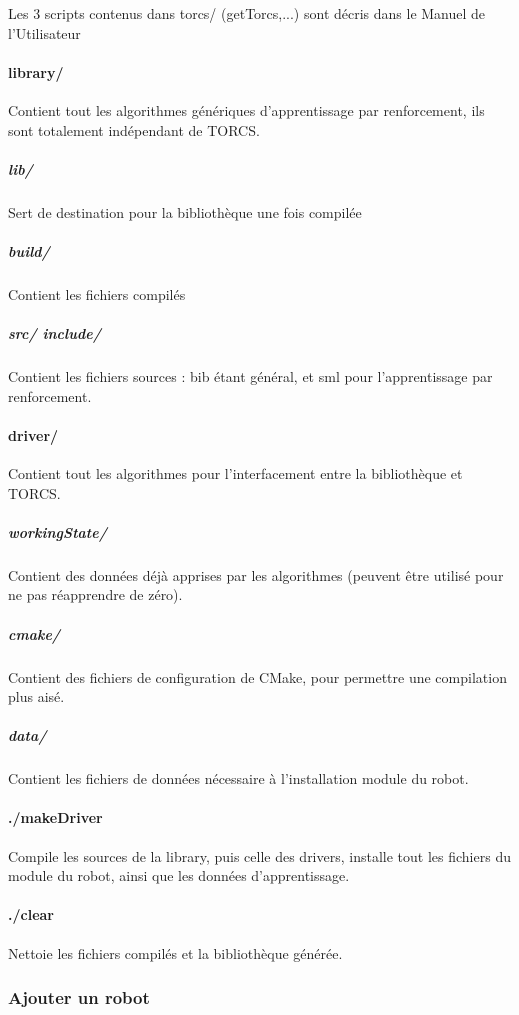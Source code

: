 \documentclass[a4paper,12pt]{article}
\begin{document}
  Les 3 scripts contenus dans torcs/ (getTorcs,...) sont décris dans le Manuel de l'Utilisateur \cite{MdU}

  \paragraph{library/} Contient tout les algorithmes génériques d'apprentissage par renforcement, ils sont
  totalement indépendant de TORCS.
    
    \subparagraph{lib/} Sert de destination pour la bibliothèque une fois compilée
    \subparagraph{build/} Contient les fichiers compilés
    \subparagraph{src/ include/} Contient les fichiers sources : bib étant général, et sml pour l'apprentissage par renforcement.
  
  \paragraph{driver/} Contient tout les algorithmes pour l'interfacement entre la bibliothèque et TORCS.
    \subparagraph{workingState/} Contient des données déjà apprises par les algorithmes (peuvent être
    utilisé pour ne pas réapprendre de zéro).
    \subparagraph{cmake/} Contient des fichiers de configuration de CMake, pour permettre une compilation
    plus aisé.
    \subparagraph{data/} Contient les fichiers de données nécessaire à l'installation module du robot.
  
  
  \paragraph{./makeDriver } Compile les sources de la library, puis celle des drivers, installe tout les fichiers
  du module du robot, ainsi que les données d'apprentissage.
  
  \paragraph{./clear } Nettoie les fichiers compilés et la bibliothèque générée.
  
  \subsubsection{Ajouter un robot}
  
\end{document}
